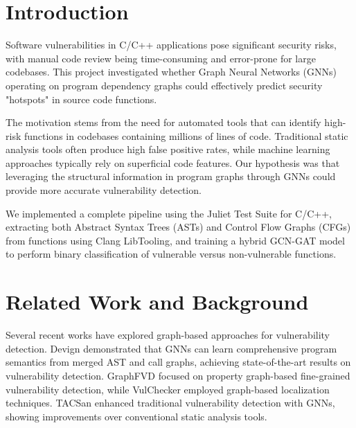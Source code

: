 \section{Introduction}

Software vulnerabilities in C/C++ applications pose significant security risks, with manual code review being time-consuming and error-prone for large codebases. This project investigated whether Graph Neural Networks (GNNs) operating on program dependency graphs could effectively predict security "hotspots" in source code functions.

The motivation stems from the need for automated tools that can identify high-risk functions in codebases containing millions of lines of code. Traditional static analysis tools often produce high false positive rates, while machine learning approaches typically rely on superficial code features. Our hypothesis was that leveraging the structural information in program graphs through GNNs could provide more accurate vulnerability detection.

We implemented a complete pipeline using the Juliet Test Suite for C/C++, extracting both Abstract Syntax Trees (ASTs) and Control Flow Graphs (CFGs) from functions using Clang LibTooling, and training a hybrid GCN-GAT model to perform binary classification of vulnerable versus non-vulnerable functions.

\section{Related Work and Background}

Several recent works have explored graph-based approaches for vulnerability detection. Devign \cite{devign} demonstrated that GNNs can learn comprehensive program semantics from merged AST and call graphs, achieving state-of-the-art results on vulnerability detection. GraphFVD \cite{graphfvd} focused on property graph-based fine-grained vulnerability detection, while VulChecker \cite{vulchecker} employed graph-based localization techniques. TACSan \cite{tacsan} enhanced traditional vulnerability detection with GNNs, showing improvements over conventional static analysis tools.

